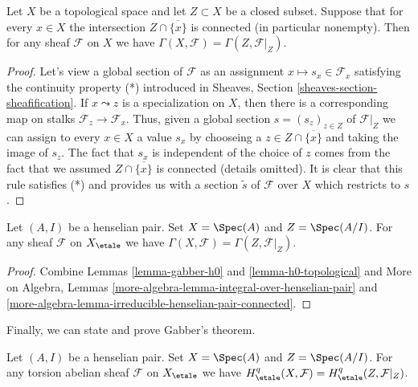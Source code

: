 \begin{lemma}
\label{lemma-h0-topological}
Let $X$ be a topological space and let $Z \subset X$ be a closed subset.
Suppose that for every $x \in X$ the intersection $Z \cap \overline{\{x\}}$
is connected (in particular nonempty). Then for any sheaf $\mathcal{F}$
on $X$ we have $\Gamma(X, \mathcal{F}) = \Gamma(Z, \mathcal{F}|_Z)$.
\end{lemma}

\begin{proof}
Let's view a global section of $\mathcal{F}$ as an assignment
$x \mapsto s_x \in \mathcal{F}_x$ satisfying the continuity
property (*) introduced in
Sheaves, Section \ref{sheaves-section-sheafification}.
If $x \leadsto z$ is a specialization on $X$, then there is
a corresponding map on stalks $\mathcal{F}_z \to \mathcal{F}_x$.
Thus, given a global section $s = (s_z)_{z \in Z}$ of
$\mathcal{F}|_Z$ we can assign to every $x \in X$ a value
$s_x$ by chooseing a $z \in Z \cap \overline{\{x\}}$
and taking the image of $s_z$. The fact that $s_x$ is independent
of the choice of $z$ comes from the fact that we assumed
$Z \cap \overline{\{x\}}$ is connected (details omitted). It is clear that this
rule satisfies (*) and provides us with a section $\tilde s$ of
$\mathcal{F}$ over $X$ which restricts to $s$.
\end{proof}

\begin{lemma}
\label{lemma-h0-henselian-pair}
Let $(A, I)$ be a henselian pair. Set $X = \Spec(A)$ and
$Z = \Spec(A/I)$. For any sheaf $\mathcal{F}$ on $X_\etale$
we have $\Gamma(X, \mathcal{F}) = \Gamma(Z, \mathcal{F}|_Z)$.
\end{lemma}

\begin{proof}
Combine
Lemmas \ref{lemma-gabber-h0} and \ref{lemma-h0-topological}
and
More on Algebra, Lemmas
\ref{more-algebra-lemma-integral-over-henselian-pair} and
\ref{more-algebra-lemma-irreducible-henselian-pair-connected}.
\end{proof}

\noindent
Finally, we can state and prove Gabber's theorem.

\begin{theorem}[Gabber]
\label{theorem-gabber}
Let $(A, I)$ be a henselian pair. Set $X = \Spec(A)$ and
$Z = \Spec(A/I)$. For any torsion abelian sheaf $\mathcal{F}$ on $X_\etale$
we have $H^q_\etale(X, \mathcal{F}) = H^q_\etale(Z, \mathcal{F}|_Z)$.
\end{theorem}

